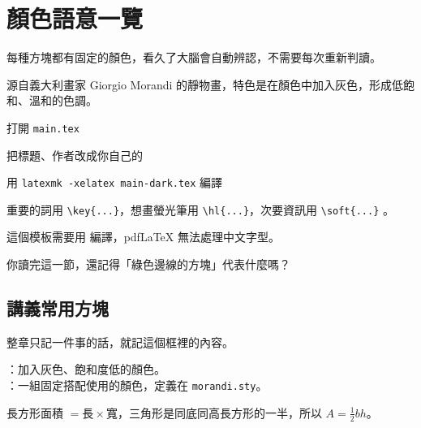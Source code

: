 \documentclass[dark]{morandi-adhd}
\begin{document}
\takeabreak

\section{顏色語意一覽}

每種方塊都有固定的顏色，看久了大腦會自動辨認，不需要每次重新判讀。

\begin{definition}[莫蘭迪色]
  源自義大利畫家 Giorgio Morandi 的靜物畫，特色是在顏色中加入灰色，形成低飽和、溫和的色調。
\end{definition}

\begin{example}
  \begin{steps}
    \item 打開 \texttt{main.tex}
    \item 把標題、作者改成你自己的
    \item 用 \texttt{latexmk -xelatex main-dark.tex} 編譯
  \end{steps}
\end{example}

\begin{tip}
  重要的詞用 \verb|\key{...}|，想畫螢光筆用 \verb|\hl{...}|，次要資訊用 \verb|\soft{...}| 。
\end{tip}

\begin{warning}
  這個模板需要用  編譯，pdfLaTeX 無法處理中文字型。
\end{warning}

\begin{question}
  你讀完這一節，還記得「綠色邊線的方塊」代表什麼嗎？
\end{question}

\subsection{講義常用方塊}

\begin{bigidea}
  整章只記一件事的話，就記這個框裡的內容。
\end{bigidea}

\begin{terms}
  ：加入灰色、飽和度低的顏色。\\
  ：一組固定搭配使用的顏色，定義在 \texttt{morandi.sty}。
\end{terms}

\begin{derivation}[面積公式]
  長方形面積 $= \text{長} \times \text{寬}$，三角形是同底同高長方形的一半，所以
  $A = \tfrac{1}{2}bh$。
\end{derivation}
\end{document}
